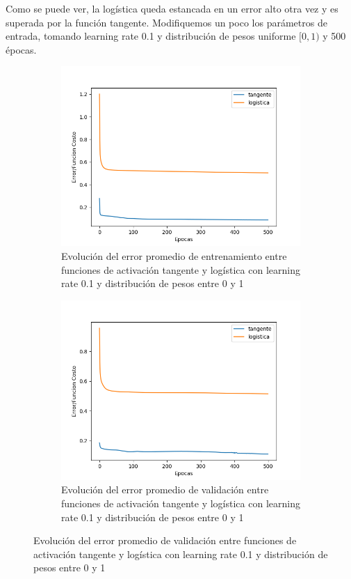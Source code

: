 Como se puede ver, la logística queda estancada en un error alto otra vez y es superada por la función tangente. 
Modifiquemos un poco los parámetros de entrada, tomando learning rate 0.1 y distribución de pesos uniforme $[0, 1)$ y 500 épocas. 

\begin{figure}[!htbp]
\centering
\begin{subfigure}{.5\textwidth}
  \centering
  \includegraphics[width=1\linewidth]{graficos/ej2/factivaciones_promedios_entrenamiento.png}
  \caption{Evolución del error promedio de entrenamiento entre funciones de activación tangente y logística con learning rate 0.1 y distribución de pesos entre 0 y 1}
  \label{fig:sub1}
\end{subfigure}%
\begin{subfigure}{.5\textwidth}
  \centering
  \includegraphics[width=1\linewidth]{graficos/ej2/factivaciones_promedios_validacion.png}
  \caption{Evolución del error promedio de validación entre funciones de activación tangente y logística con learning rate 0.1 y distribución de pesos entre 0 y 1}
  \label{fig:sub2}
\end{subfigure}
\end{figure}

